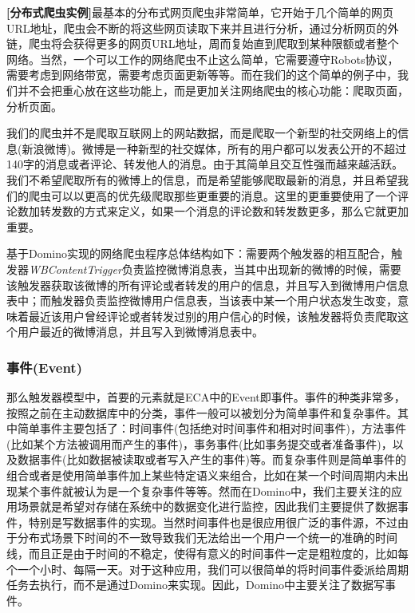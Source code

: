 \begin{Sbox}
\begin{minipage}{5in}
\setlength\parindent{1pc}
\textbf{[分布式爬虫实例]}最基本的分布式网页爬虫非常简单，它开始于几个简单的网页URL地址，爬虫会不断的将这些网页读取下来并且进行分析，通过分析网页的外链，爬虫将会获得更多的网页URL地址，周而复始直到爬取到某种限额或者整个网络。当然，一个可以工作的网络爬虫不止这么简单，它需要遵守Robots协议，需要考虑到网络带宽，需要考虑页面更新等等。而在我们的这个简单的例子中，我们并不会把重心放在这些功能上，而是更加关注网络爬虫的核心功能：爬取页面，分析页面。

我们的爬虫并不是爬取互联网上的网站数据，而是爬取一个新型的社交网络上的信息(新浪微博)。微博是一种新型的社交媒体，所有的用户都可以发表公开的不超过140字的消息或者评论、转发他人的消息。由于其简单且交互性强而越来越活跃。我们不希望爬取所有的微博上的信息，而是希望能够爬取最新的消息，并且希望我们的爬虫可以以更高的优先级爬取那些更重要的消息。这里的更重要使用了一个评论数加转发数的方式来定义，如果一个消息的评论数和转发数更多，那么它就更加重要。

基于Domino实现的网络爬虫程序总体结构如下：需要两个触发器的相互配合，触发器\textit{WBContentTrigger}负责监控微博消息表，当其中出现新的微博的时候，需要该触发器获取该微博的所有评论或者转发的用户的信息，并且写入到微博用户信息表中；而触发器负责监控微博用户信息表，当该表中某一个用户状态发生改变，意味着最近该用户曾经评论或者转发过别的用户信心的时候，该触发器将负责爬取这个用户最近的微博消息，并且写入到微博消息表中。
\end{minipage}
\end{Sbox}
\shadowbox{\TheSbox}

\subsubsection{事件(Event)}
那么触发器模型中，首要的元素就是ECA中的Event即事件。事件的种类非常多，按照之前在主动数据库中的分类，事件一般可以被划分为简单事件和复杂事件。其中简单事件主要包括了：时间事件(包括绝对时间事件和相对时间事件)，方法事件(比如某个方法被调用而产生的事件)，事务事件(比如事务提交或者准备事件)，以及数据事件(比如数据被读取或者写入产生的事件)等。而复杂事件则是简单事件的组合或者是使用简单事件加上某些特定语义来组合，比如在某一个时间周期内未出现某个事件就被认为是一个复杂事件等等。然而在Domino中，我们主要关注的应用场景就是希望对存储在系统中的数据变化进行监控，因此我们主要提供了数据事件，特别是写数据事件的实现。当然时间事件也是很应用很广泛的事件源，不过由于分布式场景下时间的不一致导致我们无法给出一个用户一个统一的准确的时间线，而且正是由于时间的不稳定，使得有意义的时间事件一定是粗粒度的，比如每个一个小时、每隔一天。对于这种应用，我们可以很简单的将时间事件委派给周期任务去执行，而不是通过Domino来实现。因此，Domino中主要关注了数据写事件。

